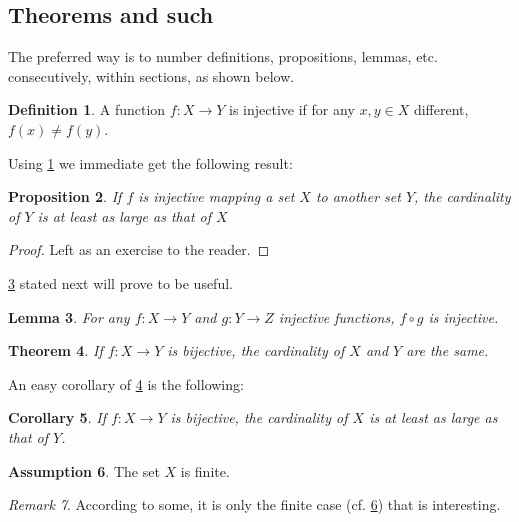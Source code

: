 \documentclass{article}
\theoremstyle{plain}
\newtheorem{theorem}{Theorem}[section]
\newtheorem{proposition}[theorem]{Proposition}
\newtheorem{lemma}[theorem]{Lemma}
\newtheorem{corollary}[theorem]{Corollary}
\theoremstyle{definition}
\newtheorem{definition}[theorem]{Definition}
\newtheorem{assumption}[theorem]{Assumption}
\theoremstyle{remark}
\newtheorem{remark}[theorem]{Remark}
\begin{document}
\subsection{Theorems and such}
The preferred way is to number definitions, propositions, lemmas, etc. consecutively, within sections, as shown below.
\begin{definition}
\label{def:inj}
A function $f:X \to Y$ is injective if for any $x,y\in X$ different, $f(x)\ne f(y)$.
\end{definition}
Using \cref{def:inj} we immediate get the following result:
\begin{proposition}
If $f$ is injective mapping a set $X$ to another set $Y$, 
the cardinality of $Y$ is at least as large as that of $X$
\end{proposition}
\begin{proof} 
Left as an exercise to the reader. 
\end{proof}
\cref{lem:usefullemma} stated next will prove to be useful.
\begin{lemma}
\label{lem:usefullemma}
For any $f:X \to Y$ and $g:Y\to Z$ injective functions, $f \circ g$ is injective.
\end{lemma}
\begin{theorem}
\label{thm:bigtheorem}
If $f:X\to Y$ is bijective, the cardinality of $X$ and $Y$ are the same.
\end{theorem}
An easy corollary of \cref{thm:bigtheorem} is the following:
\begin{corollary}
If $f:X\to Y$ is bijective, 
the cardinality of $X$ is at least as large as that of $Y$.
\end{corollary}
\begin{assumption}
The set $X$ is finite.
\label{ass:xfinite}
\end{assumption}
\begin{remark}
According to some, it is only the finite case (cf. \cref{ass:xfinite}) that is interesting.
\end{remark}


\nocite{langley00}





\end{document}
